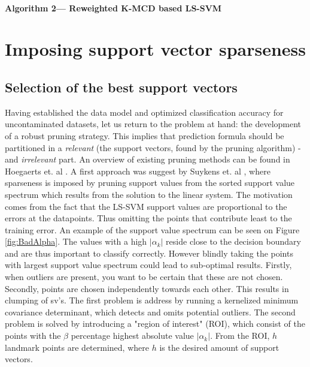 \documentclass[preprint,12pt]{elsarticle}
\begin{document}

\paragraph{Algorithm 2--- Reweighted K-MCD based LS-SVM}

\newpage
\section{Imposing support vector sparseness}

\subsection{Selection of the best support vectors}

Having established the data model and optimized classification accuracy for uncontaminated datasets, let us return to the problem at hand: the development of a robust pruning strategy. This implies that prediction formula should be partitioned in a \textit{relevant} (the support vectors, found by the pruning algorithm) - and \textit{irrelevant} part.  An overview of existing pruning methods can be found in Hoegaerts et. al \cite{hoegaerts2004comparison}. A first approach was suggest by Suykens et. al \cite{suykens2000sparse}, where  sparseness is imposed by pruning support values from the sorted support value spectrum which results from the solution to the linear system.  The motivation comes from the fact that the LS-SVM support values are proportional to the errors at the datapoints. Thus omitting the points that contribute least to the training error. An example of the support value spectrum can be seen on Figure \ref{fig:BadAlpha}. The values with a high $|\alpha_k|$ reside close to the decision boundary and are thus important to classify correctly. However blindly taking the points with largest support value spectrum could lead to sub-optimal results. Firstly, when outliers are present, you want to be certain that these are not chosen. Secondly, points are chosen independently towards each other. This results in clumping of sv's. The first problem is address by running a kernelized minimum covariance determinant, which detects and omits potential outliers. The second problem is solved by introducing a "region of interest" (ROI), which consist of the points with the $\beta$ percentage highest absolute value $|\alpha_k|$. From the ROI, $h$ landmark points are determined, where $h$ is the desired amount of support vectors.
\end{document}
